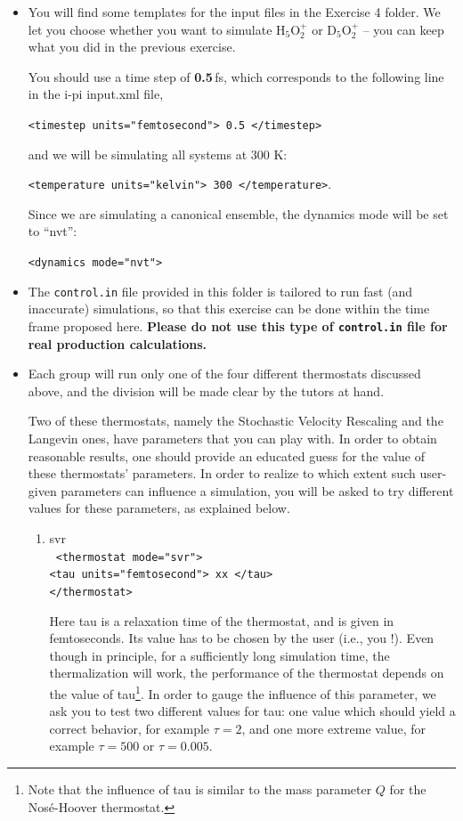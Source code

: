 \documentclass[a4paper,11pt]{scrartcl}
\begin{document}
\begin{itemize}

\item You will find some templates for the input files in the Exercise 4 folder. We let you choose whether you want to simulate H$_5$O$_2^+$ or D$_5$O$_2^+$ -- you can keep what you did in the previous exercise.

You should use a time step of \textbf{0.5}\,fs, which corresponds to the following line in the i-pi input.xml file,

\texttt{<timestep units="femtosecond"> 0.5 </timestep>}

and we will be simulating all systems at 300 K:

\texttt{<temperature units="kelvin"> 300 </temperature>}.

Since we are simulating a canonical ensemble, the dynamics mode will be set to ``nvt'':

\texttt{<dynamics mode="nvt">}

\item The \texttt{control.in} file provided in this folder is tailored to run fast (and inaccurate) simulations, so that this exercise can be done within the time frame proposed here. \textbf{Please do not use this type of \texttt{control.in} file for real production calculations.}

\item Each group will run only one of the four different thermostats discussed above, and the division will be made clear by the tutors at hand.

Two of these thermostats, namely the Stochastic Velocity Rescaling and the Langevin ones, have parameters that you can play with.
In order to obtain reasonable results, one should provide an educated guess for the value of these thermostats' parameters.
In order to realize to which extent such user-given parameters can influence a simulation, 
you will be asked to try different values for these parameters, as explained below.

\begin{enumerate}

\item svr \\
\texttt{ <thermostat mode="svr">\\
         <tau units="femtosecond"> xx </tau>\\
         </thermostat>
      }

Here tau is a relaxation time of the thermostat, and is given in femtoseconds.
Its value has to be chosen by the user (i.e., you !). Even though in principle, for a sufficiently long simulation time,
the thermalization will work, the performance of the thermostat depends on the value of tau\footnote{Note that the influence of tau is similar to the mass parameter $Q$ for the Nos\'e-Hoover thermostat.}. In order to gauge the influence of this parameter, we ask you to test two different values for tau: one value which should yield a correct behavior, for example $\tau=2$, and one more extreme value, for example $\tau=500$ or $\tau=0.005$.




\end{enumerate}
\end{itemize}
\end{document}
